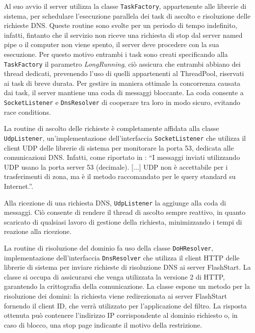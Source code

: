 \documentclass[12pt,a4paper,openright,twoside]{book}
\newcommand{\class}[1]{\texttt{#1}}
\begin{document}
Al suo avvio il server utilizza la classe \class{TaskFactory}, appartenente alle librerie di sistema, per schedulare l'esecuzione parallela dei task di ascolto e risoluzione delle richieste \gls{DNS}.
Queste routine sono svolte per un periodo di tempo indefinito, infatti, fintanto che il servizio non riceve una richiesta di stop dal server named pipe o il computer non viene spento, il server deve procedere con la sua esecuzione.
Per questo motivo entrambi i task sono creati specificando alla \class{TaskFactory} il parametro \textit{LongRunning}, ciò assicura che entrambi abbiano dei thread dedicati, prevenendo l'uso di quelli appartenenti al ThreadPool, riservati ai task di breve durata.
Per gestire in maniera ottimale la concorrenza causata dai task, il server mantiene una coda di messaggi bloccante.
La coda consente a \class{SocketListener} e \class{DnsResolver} di cooperare tra loro in modo sicuro, evitando race conditions.

La routine di ascolto delle richieste è completamente affidata alla classe \class{UdpListener}, un'implementazione dell'interfaccia \class{SocketListener} che utilizza il client UDP delle librerie di sistema per monitorare la porta 53, dedicata alle comunicazioni \gls{DNS}.
Infatti, come riportato in \cite{RFC1035}: ``I messaggi inviati utilizzando UDP usano la porta server 53 (decimale). [...] UDP non è accettabile per i trasferimenti di zona, ma è il metodo raccomandato per le query standard su Internet.''.

Alla ricezione di una richiesta \gls{DNS}, \class{UdpListener} la aggiunge alla coda di messaggi.
Ciò consente di rendere il thread di ascolto sempre reattivo, in quanto scaricato di qualsiasi lavoro di gestione della richiesta, minimizzando i tempi di reazione alla ricezione.


La routine di risoluzione del dominio fa uso della classe \class{DoHResolver}, implementazione dell'interfaccia \class{DnsResolver} che utilizza il client HTTP delle librerie di sistema per inviare richieste di risoluzione \gls{DNS} ai server FlashStart.
La classe si occupa di assicurarsi che venga utilizzata la versione 2 di HTTP, garantendo la crittografia della comunicazione.
La classe espone un metodo per la risoluzione dei domini: la richiesta viene redirezionata ai server FlashStart fornendo il client ID, che verrà utilizzato per l'applicazione del filtro.
La risposta ottenuta può contenere l'indirizzo IP corrispondente al dominio richiesto o, in caso di blocco, una stop page indicante il motivo della restrizione.  
\end{document}

